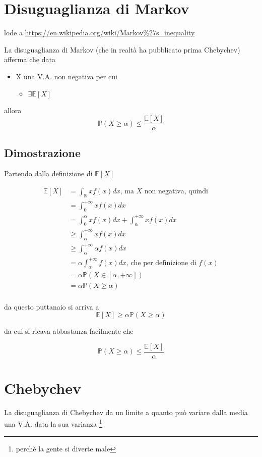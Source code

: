 \documentclass[11pt]{article}
\author{Biggus Diccus}
\date{\today}
\title{}
\begin{document}
\tableofcontents

\section{Disuguaglianza di Markov}
\label{sec:orge3e98d1}
lode a \url{https://en.wikipedia.org/wiki/Markov\%27s\_inequality}

La disuguaglianza di Markov (che in realtà ha pubblicato prima Chebychev) afferma che data
\begin{itemize}
\item X una V.A. non negativa per cui
\begin{itemize}
\item \(\exists \mathbb{E}[X]\)
\end{itemize}
\end{itemize}
allora
\[\mathbb{P}(X \geq \alpha) \leq \frac{\mathbb{E}[X]}{\alpha}\]

\subsection{Dimostrazione}
\label{sec:org78590db}
Partendo dalla definizione di \(\mathbb{E}[X]\)

\begin{align*}
\mathbb{E}[X] &= \int_{\mathbb{R}} xf(x)dx \text{, ma $X$ non negativa, quindi} \\
&= \int_{0}^{+ \infty} xf(x) dx \\
&= \int_{0}^{\alpha} xf(x) dx + \int_{\alpha}^{+ \infty} xf(x) dx \\
&\geq \int_{\alpha}^{+ \infty} xf(x) dx \\
&\geq \int_{\alpha}^{+ \infty} \alpha f(x) dx \\
&= \alpha \int_{\alpha}^{+ \infty} f(x) dx \text{, che per definizione di $f(x)$} \\
&= \alpha \mathbb{P}(X \in [\alpha, + \infty]) \\
&= \alpha \mathbb{P}(X \geq \alpha) \\
\end{align*}

da questo puttanaio si arriva a
\[ \mathbb{E}[X] \geq \alpha \mathbb{P}(X \geq \alpha) \]

da cui si ricava abbastanza facilmente che

\[ \mathbb{P}(X \geq \alpha) \leq \frac{\mathbb{E}[X]}{\alpha} \]

\section{Chebychev}
\label{sec:org54e5aff}
La disuguaglianza di Chebychev da un limite a quanto può variare dalla media una V.A. data
la sua varianza \footnote{perchè la gente si diverte male}
\end{document}
